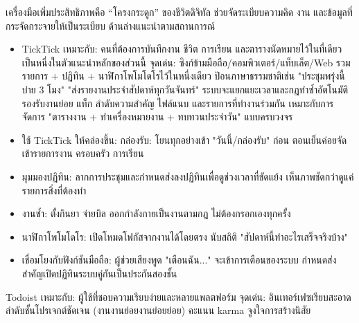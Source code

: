 


เครื่องมือเพิ่มประสิทธิภาพคือ “โครงกระดูก” ของชีวิตดิจิทัล ช่วยจัดระเบียบความคิด งาน และข้อมูลที่กระจัดกระจายให้เป็นระเบียบ ด้านล่างแนะนำตามสถานการณ์


\begin{itemize}
  \item TickTick เหมาะกับ: คนที่ต้องการบันทึกงาน ชีวิต การเรียน และตารางนัดหมายไว้ในที่เดียว เป็นหนึ่งในตัวแนะนำหลักของส่วนนี้ จุดเด่น: ซิงก์ข้ามมือถือ/คอมพิวเตอร์/แท็บเล็ต/Web รวมรายการ + ปฏิทิน + นาฬิกาโพโมโดโรไว้ในหนึ่งเดียว ป้อนภาษาธรรมชาติเช่น "ประชุมพรุ่งนี้บ่าย 3 โมง" "ส่งรายงานประจำสัปดาห์ทุกวันจันทร์" ระบบจะแยกแยะเวลาและกฎทำซ้ำอัตโนมัติ รองรับงานย่อย แท็ก ลำดับความสำคัญ ไฟล์แนบ และรายการที่ทำงานร่วมกัน เหมาะกับการจัดการ "ตารางงาน + ทำเครื่องหมายงาน + ทบทวนประจำวัน" แบบครบวงจร
  \item ใช้ TickTick ให้คล่องขึ้น: กล่องรับ: โยนทุกอย่างเข้า "วันนี้/กล่องรับ" ก่อน ตอนเย็นค่อยจัดเข้ารายการงาน ครอบครัว การเรียน
  \item มุมมองปฏิทิน: ลากการประชุมและกำหนดส่งลงปฏิทินเพื่อดูช่วงเวลาที่ขัดแย้ง เห็นภาพชัดกว่าดูแค่รายการสิ่งที่ต้องทำ
  \item งานซ้ำ: ตั้งกินยา จ่ายบิล ออกกำลังกายเป็นงานตามกฎ ไม่ต้องกรอกเองทุกครั้ง
  \item นาฬิกาโพโมโดโร: เปิดโหมดโฟกัสจากงานได้โดยตรง นับสถิติ "สัปดาห์นี้ทำอะไรเสร็จจริงบ้าง"
  \item เชื่อมโยงกับฟังก์ชันมือถือ: ผู้ช่วยเสียงพูด "เตือนฉัน..." จะเข้าการเตือนของระบบ กำหนดส่งสำคัญเปิดปฏิทินระบบคู่กันเป็นประกันสองชั้น
\end{itemize}

Todoist เหมาะกับ: ผู้ใช้ที่ชอบความเรียบง่ายและหลายแพลตฟอร์ม จุดเด่น: อินเทอร์เฟซเรียบสะอาด ลำดับชั้นโปรเจกต์ชัดเจน (งานงานย่อยงานย่อยย่อย) คะแนน karma จูงใจการสร้างนิสัย

